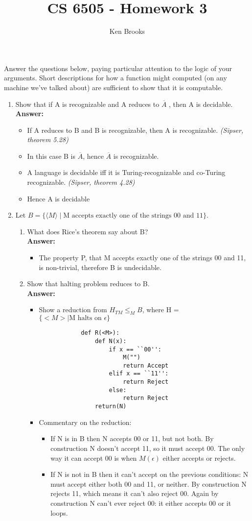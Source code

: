 \documentclass[12pt]{article}
\title{CS 6505 - Homework 3}
\author{Ken Brooks}
\begin{document}
\lstset{language=Python, tabsize = 4}
Answer the questions below, paying particular attention to the logic of your arguments. Short descriptions for how a function might computed (on any machine we’ve talked about) are sufficient to show that it is computable.
\begin{enumerate}
	\item Show that if A is recognizable and A reduces to $\overline{A}$ , then A is decidable.
	\\[.2in]\textbf{Answer:}
	\begin{itemize}
	\item If A reduces to B and B is recognizable, then A is recognizable. \textit{(Sipser, theorem 5.28)}
	\item In this case B is $\overline{A}$, hence $\overline{A}$ is recognizable.
	\item A language is decidable iff it is Turing-recognizable and co-Turing recognizable. \textit{(Sipser, theorem 4.28)}
	\item Hence A is decidable
	\end{itemize}
	\item Let $ B = \{\langle M \rangle \mid \mbox{M accepts exactly one of the strings 00 and 11\}}$.
		\begin{enumerate}
		\item What does Rice's theorem say about B?
			\\[.2in]\textbf{Answer:}
			\begin{itemize}
			\item The property P, that M accepts exactly one of the strings 00 and 11, is non-trivial, therefore B is undecidable.
			\end{itemize}
		\item Show that halting problem reduces to B.
			\\[.2in]\textbf{Answer:}
			\begin{itemize}
			\item Show a reduction from $H_{TM} \leq_{M}B$, where H = $\{<M> \mid \mbox{M halts on } \epsilon\}$
			\begin{lstlisting}
			def R(<M>):
				def N(x):
					if x == ``00'':
						M("")
						return Accept
					elif x == ``11'':
						return Reject
					else:
						return Reject
				return(N)
			\end{lstlisting}
			\item Commentary on the reduction:
			\begin{itemize}
				\item If N is in B then N accepts 00 or 11, but not both.  By construction N doesn't accept 11, so it must accept 00.  The only way it can accept 00 is when $M(\epsilon)$ either accepts or rejects.
				\item If N is not in B then it can't accept on the previous conditions: N must accept either both 00 and 11, or neither. By construction N rejects 11, which means it can't also reject 00. Again by construction N can't ever reject 00: it either accepts 00 or it loops.
			\end{itemize}



\end{itemize}
\end{enumerate}
\end{enumerate}
\end{document}
